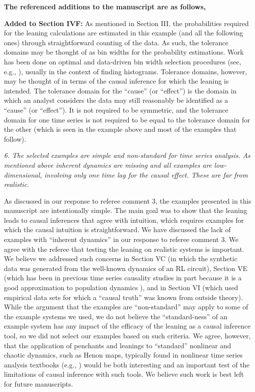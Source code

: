 \documentclass[a4paper,11pt]{article}
\begin{document}
{\bf The referenced additions to the manuscript are as follows,}

{\bf Added to Section IVF:} As mentioned in Section III, the probabilities required for the leaning calculations are estimated in this example (and all the following ones) through straightforward counting of the data.  As such, the tolerance domains may be thought of as bin widths for the probability estimations.  Work has been done on optimal and data-driven bin width selection procedures (see, e.g., \cite{Wand1997}), usually in the context of finding histograms.  Tolerance domains, however, may be thought of in terms of the causal inference for which the leaning is intended.  The tolerance domain for the ``cause'' (or ``effect'') is the domain in which an analyst considers the data may still reasonably be identified as a ``cause'' (or ``effect'').  It is not required to be symmetric, and the tolerance domain for one time series is not required to be equal to the tolerance domain for the other (which is seen in the example above and most of the examples that follow). 

\vspace{0.5cm}
{\em 6. The selected examples are simple and non-standard for time series analysis. As mentioned above inherent dynamics are missing and all examples are low-dimensional, involving only one time lag for the causal effect. These are far from realistic.}
\vspace{0.5cm}

As discussed in our response to referee comment 3, the examples presented in this manuscript are intentionally simple.  The main goal was to show that the leaning leads to causal inferences that agree with intuition, which requires examples for which the causal intuition is straightforward.  We have discussed the lack of examples with ``inherent dynamics'' in our response to referee comment 3.  We agree with the referee that testing the leaning on realistic systems is important.  We believe we addressed such concerns in Section VC (in which the synthetic data was generated from the well-known dynamics of an RL circuit), Section VE (which has been in previous time series causality studies in part because it is a good approximation to population dynamics \cite{Sugihara2012}), and in Section VI (which used empirical data sets for which a ``causal truth'' was known from outside theory).  While the argument that the examples are ``non-standard'' may apply to some of the example systems we used, we do not believe the ``standard-ness'' of an example system has any impact of the efficacy of the leaning as a causal inference tool, so we did not select our examples based on such criteria.  We agree, however, that the application of penchants and leanings to ``standard'' nonlinear and chaotic dynamics, such as Henon maps, typically found in nonlinear time series analysis textbooks (e.g., \cite{Kantz2004}) would be both interesting and an important test of the limitations of causal inference with such tools.  We believe such work is best left for future manuscripts.
\end{document}
